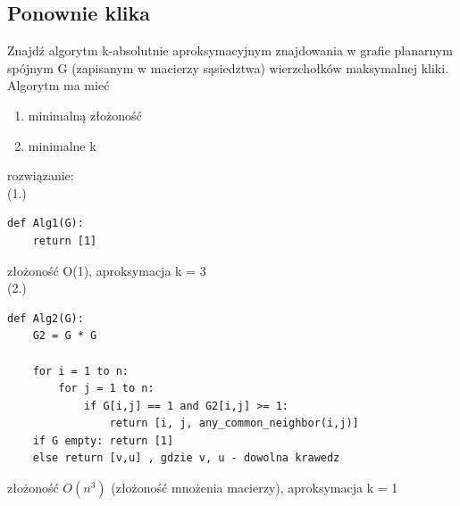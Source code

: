 \documentclass{article}
\begin{document}
\subsection*{Ponownie klika}
Znajdź algorytm k-absolutnie aproksymacyjnym znajdowania w grafie planarnym spójnym G (zapisanym w macierzy sąsiedztwa) wierzchołków maksymalnej kliki. Algorytm ma mieć
\begin{enumerate}
\item minimalną złożoność
\item minimalne k
\end{enumerate}
rozwiązanie: \\
(1.)
\begin{lstlisting}
def Alg1(G):
	return [1]
\end{lstlisting}
złożoność O(1), aproksymacja k = 3 \\
(2.)
\begin{lstlisting}
def Alg2(G):
	G2 = G * G
	
	for i = 1 to n:
		for j = 1 to n:
			if G[i,j] == 1 and G2[i,j] >= 1:
				return [i, j, any_common_neighbor(i,j)]
	if G empty: return [1]
	else return [v,u] , gdzie v, u - dowolna krawedz
\end{lstlisting}
złożoność $O(n^3)$ (złożoność mnożenia macierzy),  aproksymacja k = 1
\end{document}
